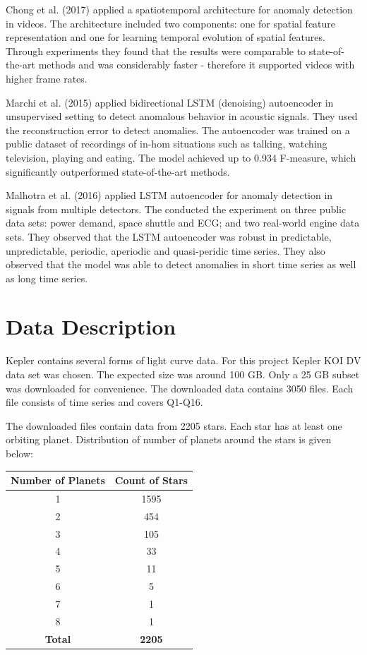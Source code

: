 \documentclass[%
aip,
amsmath,amssymb,
reprint,%
]{revtex4-1}
\begin{document}
Chong et al. (2017) applied a spatiotemporal architecture for anomaly detection in videos. The architecture included two components: one for spatial feature representation and one for learning temporal evolution of spatial features. Through experiments they found that the results were comparable to state-of-the-art methods and was considerably faster - therefore it supported videos with higher frame rates.

Marchi et al. (2015) applied bidirectional LSTM (denoising) autoencoder in unsupervised setting to detect anomalous behavior in acoustic signals. They used the reconstruction error to detect anomalies. The autoencoder was trained on a public dataset of recordings of in-hom situations such as talking, watching television, playing and eating. The model achieved up to 0.934 F-measure, which significantly outperformed state-of-the-art methods.

Malhotra et al. (2016) applied LSTM autoencoder for anomaly detection in signals from multiple detectors. The conducted the experiment on three public data sets: power demand, space shuttle and ECG; and two real-world engine data sets. They observed that the LSTM autoencoder was robust in predictable, unpredictable, periodic, aperiodic and quasi-peridic time series. They also observed that the model was able to detect anomalies in short time series as well as long time series.

\section{Data Description}

Kepler contains several forms of light curve data. For this project Kepler KOI DV data set was chosen. The expected size was around 100 GB. Only a 25 GB subset was downloaded for convenience. The downloaded data contains 3050 files. Each file consists of time series and covers Q1-Q16.

The downloaded files contain data from 2205 stars. Each star has at least one orbiting planet. Distribution of number of planets around the stars is given below:

\begin{center}
 \begin{tabular}{| c | c |} 
 \hline
 \textbf{Number of Planets} & \textbf{Count of Stars}\\ [0.5 ex]
 \hline
 1 & 1595 \\ 
 \hline
 2 & 454 \\
 \hline
 3 & 105 \\
 \hline
 4 & 33 \\
 \hline
 5 & 11 \\
 \hline
 6 & 5 \\
 \hline
 7 & 1 \\
 \hline
 8 & 1 \\
 \hline
 \textbf{Total} & \textbf{2205} \\ [1ex] 
 \hline
\end{tabular}
\end{center}
\end{document}
